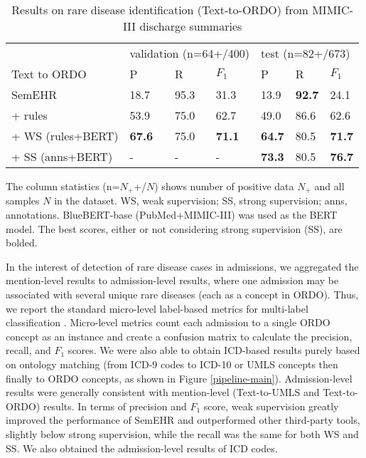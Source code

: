 \documentclass[twocolumn]{bmcart}
\begin{document}
\begin{table}[t]
\caption{Results on rare disease identification (Text-to-ORDO) from MIMIC-III discharge summaries}
\scriptsize
\center
\label{mention_rd_id_results}
\begin{threeparttable}
\begin{tabular}{llll|lll}
\cline{1-7}
                            & \multicolumn{3}{l}{validation (n=64+/400)}         & \multicolumn{3}{l}{test (n=82+/673)}               \\
Text to ORDO      & P             & R              & $F_1$         & P             & R              & $F_1$       \\
\cline{1-7}
SemEHR \cite{Wu2018semehr} & 18.7          & 95.3           & 31.3          & 13.9          & \textbf{92.7} & 24.1         \\
+ rules                     & 53.9          & 75.0           & 62.7          & 49.0          & 86.6           & 62.6               \\
+ WS (rules+BERT)           & \textbf{67.6} & 75.0           & \textbf{71.1} & \textbf{64.7} & 80.5           & \textbf{71.7}     \\
\hline\hline
+ SS (anns+BERT)            & -             & -              & -             & \textbf{73.3} & 80.5           & \textbf{76.7}      \\
\cline{1-7}
\end{tabular}
\begin{tablenotes}
\item The column statistics (n=$N_+$+/$N$) shows number of positive data $N_+$ and all samples $N$ in the dataset. WS, weak supervision; SS, strong supervision; anns, annotations. BlueBERT-base (PubMed+MIMIC-III) was used as the BERT model. The best scores, either or not considering strong supervision (SS), are bolded.
\end{tablenotes}
\end{threeparttable}
\end{table}

In the interest of detection of rare disease cases in admissions, we aggregated the mention-level results to admission-level results, where one admission may be associated with several unique rare diseases (each as a concept in ORDO). Thus, we report the standard micro-level label-based metrics for multi-label classification \cite{Gibaja2015}. Micro-level metrics count each admission to a single ORDO concept as an instance and create a confusion matrix to calculate the precision, recall, and $F_1$ scores. We were also able to obtain ICD-based results purely based on ontology matching (from ICD-9 codes to ICD-10 or UMLS concepts then finally to ORDO concepts, as shown in Figure \ref{pipeline-main}). Admission-level results were generally consistent with mention-level (Text-to-UMLS and Text-to-ORDO) results. In terms of precision and $F_1$ score, weak supervision greatly improved the performance of SemEHR and outperformed other third-party tools, slightly below strong supervision, while the recall was the same for both WS and SS. We also obtained the admission-level results of ICD codes.
\end{document}

